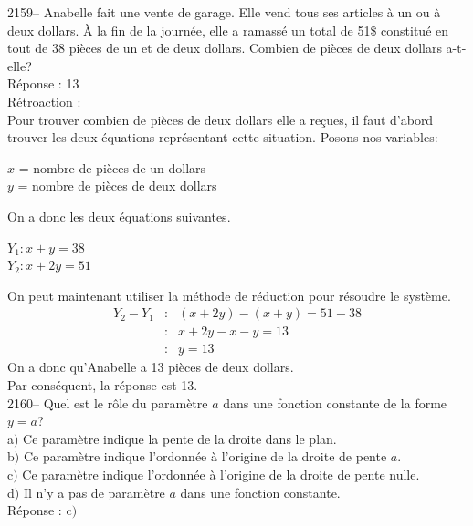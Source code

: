 \documentclass[letterpaper, 12pt]{article}
\begin{document}
2159-- Anabelle fait une vente de garage. Elle vend tous ses articles \`a un ou \`a deux dollars. \`A la fin de la journ\'ee, elle a ramass\'e un total de 51\$ constitu\'e en tout de 38 pi\`eces de un et de deux dollars. Combien de pi\`eces de deux dollars a-t-elle?\\

R\'eponse : 13\\

R\'etroaction :\\
Pour trouver combien de pi\`eces de deux dollars elle a re\c cues, il faut d'abord trouver les deux \'equations repr\'esentant cette situation. Posons nos variables:
\begin{center}
 $x$ = nombre de pi\`eces de un dollars\\
$y$ = nombre de pi\`eces de deux dollars \\
\end{center}
On a donc les deux \'equations suivantes.
\begin{center}
$Y_{1}:x+y=38$ \\
$Y_{2}:x+2y=51$\\
\end{center}
On peut maintenant utiliser la m\'ethode de r\'eduction pour r\'esoudre le syst\`eme.
\begin{eqnarray*}
Y_{2}-Y_{1}&:&(x+2y)-(x+y)=51-38\\
&:&x+2y-x-y=13\\
&:&y=13
\end{eqnarray*}
On a donc qu'Anabelle a 13 pi\`eces de deux dollars. \\
Par cons\'equent, la r\'eponse est 13.\\


2160-- Quel est le r\^ole du param\`etre $a$ dans une fonction constante de la forme $y=a$?  \\

a$)$ Ce param\`etre indique la pente de la droite dans le plan.\\
b$)$ Ce param\`etre indique l'ordonn\'ee \`a l'origine de la droite de pente $a$.\\
c$)$ Ce param\`etre indique l'ordonn\'ee \`a l'origine de la droite de pente nulle.\\
d$)$ Il n'y a pas de param\`etre $a$ dans une fonction constante.\\

R\'eponse : c$)$\\
\end{document}
